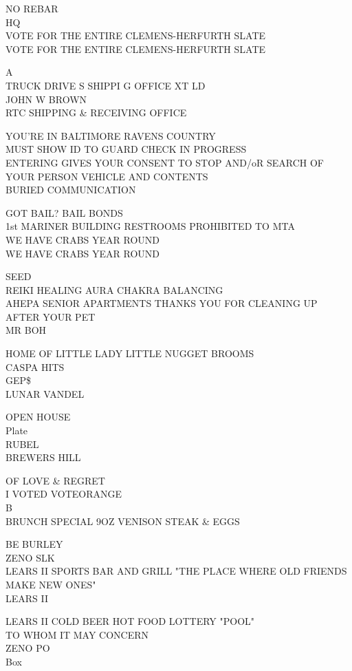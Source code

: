 \documentclass[10pt,letterpaper]{article}
\begin{document}
NO REBAR\\
HQ\\
VOTE FOR THE ENTIRE CLEMENS{-}HERFURTH SLATE\\
VOTE FOR THE ENTIRE CLEMENS{-}HERFURTH SLATE

A\\
TRUCK DRIVE S SHIPPI G OFFICE XT LD\\
JOHN W BROWN\\
RTC SHIPPING \& RECEIVING OFFICE

YOU'RE IN BALTIMORE RAVENS COUNTRY\\
MUST SHOW ID TO GUARD CHECK IN PROGRESS\\
ENTERING GIVES YOUR CONSENT TO STOP AND/oR SEARCH OF YOUR PERSON VEHICLE AND CONTENTS\\
BURIED COMMUNICATION

GOT BAIL?  BAIL BONDS\\
1st MARINER BUILDING RESTROOMS PROHIBITED TO MTA\\
WE HAVE CRABS YEAR ROUND\\
WE HAVE CRABS YEAR ROUND

SEED\\
REIKI HEALING AURA CHAKRA BALANCING\\
AHEPA SENIOR APARTMENTS THANKS YOU FOR CLEANING UP AFTER YOUR PET\\
MR BOH

HOME OF LITTLE LADY LITTLE NUGGET BROOMS\\
CASPA HITS\\
GEP\$\\
LUNAR VANDEL

OPEN HOUSE\\
Plate\\
RUBEL\\
BREWERS HILL

OF LOVE \& REGRET\\
I VOTED VOTEORANGE\\
B\\
BRUNCH SPECIAL 9OZ VENISON STEAK \& EGGS

BE BURLEY\\
ZENO SLK\\
LEARS II SPORTS BAR AND GRILL "THE PLACE WHERE OLD FRIENDS MAKE NEW ONES"\\
LEARS II

LEARS II COLD BEER HOT FOOD LOTTERY "POOL"\\
TO WHOM IT MAY CONCERN\\
ZENO PO\\
Box
\end{document}

